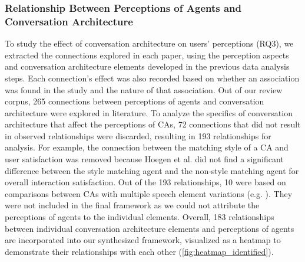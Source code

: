 \subsubsection*{Relationship Between Perceptions of Agents and Conversation Architecture}



To study the effect of conversation architecture on users' perceptions (RQ3), we extracted the connections explored in each paper, using the perception aspects and conversation architecture elements developed in the previous data analysis steps. Each connection's effect was also recorded based on whether an association was found in the study and the nature of that association. Out of our review corpus, 265 connections between perceptions of agents and conversation architecture were explored in literature. To analyze the specifics of conversation architecture that affect the perceptions of CAs, 72 connections that did not result in observed relationships were discarded, resulting in 193 relationships for analysis. For example, the connection between the matching style of a CA and user satisfaction was removed because Hoegen et al. \cite{hoegen2019end}\cmt{[31]} did not find a significant difference between the style matching agent and the non-style matching agent for overall interaction satisfaction. Out of the 193 relationships, 10 were based on comparisons between CAs with multiple speech element variations (e.g. \cite{seeger2021chatbots, volkel2021manipulating}\cmt{[35][68]}). They were not included in the final framework as we could not attribute the perceptions of agents to the individual elements. Overall, 183 relationships between individual conversation architecture elements and perceptions of agents are incorporated into our synthesized framework, visualized as a heatmap to demonstrate their relationships with each other (\autoref{fig:heatmap_identified}).



